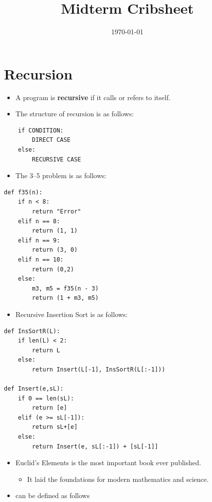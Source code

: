 \documentclass[12pt]{scrartcl}
\title{Midterm Cribsheet}
\date{\today}
\begin{document}
\maketitle

\section{Recursion}
\begin{itemize}
    \item A program is \textbf{recursive} if it calls or refers to itself.

    \item The structure of recursion is as follows:
\end{itemize}

\begin{lstlisting}
    if CONDITION:
        DIRECT CASE
    else:
        RECURSIVE CASE
\end{lstlisting}

\begin{itemize}
    \item The 3--5 problem is as follows:
\end{itemize}

\begin{lstlisting}
def f35(n):
    if n < 8:
        return "Error"
    elif n == 8:
        return (1, 1)
    elif n == 9:
        return (3, 0)
    elif n == 10:
        return (0,2)
    else:
        m3, m5 = f35(n - 3)
        return (1 + m3, m5)
\end{lstlisting}

\begin{itemize}
    \item Recursive Insertion Sort is as follows:
\end{itemize}

\begin{lstlisting}
def InsSortR(L):
    if len(L) < 2:
        return L
    else:
        return Insert(L[-1], InsSortR(L[:-1]))

def Insert(e,sL):
    if 0 == len(sL):
        return [e]
    elif (e >= sL[-1]):
        return sL+[e]
    else:
        return Insert(e, sL[:-1]) + [sL[-1]]
\end{lstlisting}

\begin{itemize}
    \item Euclid's Elements is the most important book ever published.
        \begin{itemize}
            \item It laid the foundations for modern mathematics and science.
        \end{itemize}

    \item {} can be defined as follows
\end{itemize}
\end{document}
